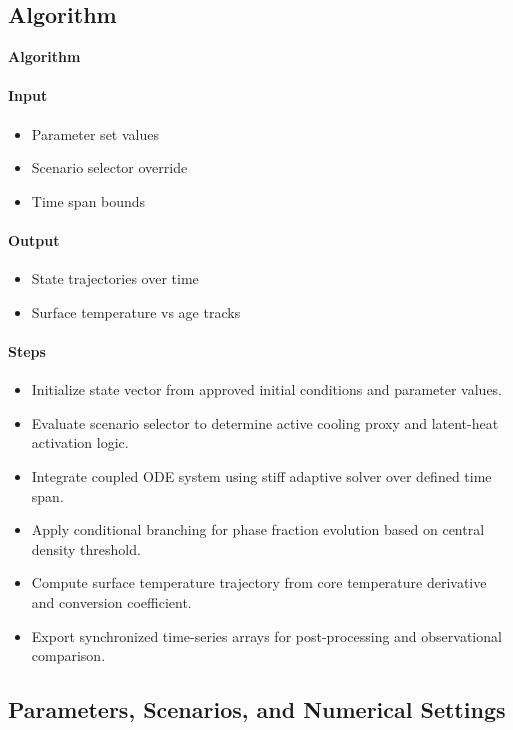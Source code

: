 \documentclass[11pt]{article}
\begin{document}
\subsection{Algorithm}

\noindent\textbf{Algorithm}
\paragraph{Input}
\begin{itemize}
\item Parameter set values
\item Scenario selector override
\item Time span bounds
\end{itemize}
\paragraph{Output}
\begin{itemize}
\item State trajectories over time
\item Surface temperature vs age tracks
\end{itemize}
\paragraph{Steps}
\begin{itemize}
\item Initialize state vector from approved initial conditions and parameter values.
\item Evaluate scenario selector to determine active cooling proxy and latent-heat activation logic.
\item Integrate coupled ODE system using stiff adaptive solver over defined time span.
\item Apply conditional branching for phase fraction evolution based on central density threshold.
\item Compute surface temperature trajectory from core temperature derivative and conversion coefficient.
\item Export synchronized time-series arrays for post-processing and observational comparison.
\end{itemize}

\subsection{Parameters, Scenarios, and Numerical Settings}
\end{document}
